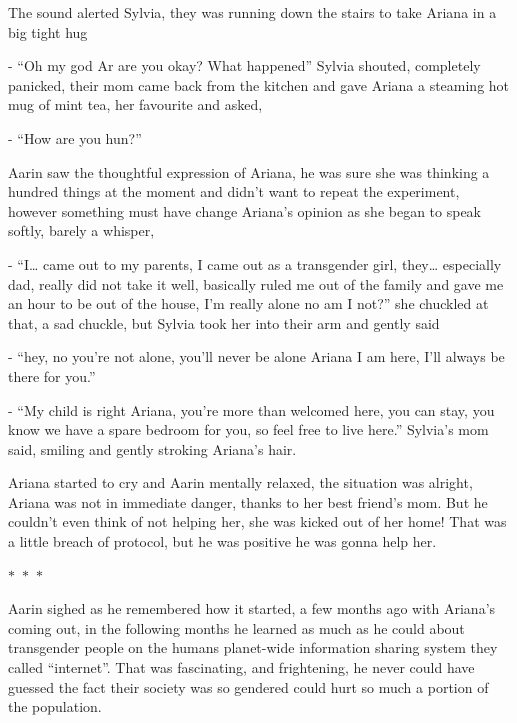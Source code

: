 \documentclass[colorlinks,12pt,a4paper]{book}
\newcommand\sep{\begin{center}
  \boldmath $\ast$~$\ast$~$\ast$
\end{center}}
\begin{document}
The sound alerted Sylvia, they was running down the stairs to take Ariana in a big tight hug\newline

- “Oh my god Ar are you okay? What happened” Sylvia shouted, completely panicked, 
their mom came back from the kitchen and gave Ariana a steaming hot mug of mint tea, her favourite and asked,\newline

- “How are you hun?”\par
\bigskip

Aarin saw the thoughtful expression of Ariana, he was sure she was thinking a hundred 
things at the moment and didn't want to repeat the experiment, however something must have change 
Ariana's opinion as she began to speak softly, barely a whisper, \par
\bigskip

- “I… came out to my parents, I came out as a transgender girl, they… especially dad, 
really did not take it well, basically ruled me out of the family and gave me an hour to be out 
of the house, I'm really alone no am I not?” she chuckled at that, a sad chuckle, 
but Sylvia took her into their arm and gently said\par
\bigskip
- “hey, no you're not alone, you'll never be alone Ariana I am here, I'll always be there for you.”\par
\bigskip
- “My child is right Ariana, you're more than welcomed here, you can stay,
 you know we have a spare bedroom for you, so feel free to live here.” Sylvia's mom said,
  smiling and gently stroking Ariana's hair.\par
  \bigskip

Ariana started to cry and Aarin mentally relaxed, the situation was alright, 
Ariana was not in immediate danger, thanks to her best friend's mom.
 But he couldn't even think of not helping her, she was kicked out of her home! That was a little breach of protocol,
 but he was positive he was gonna help her.

 \sep

Aarin sighed as he remembered how it started, a few months ago with Ariana's coming out, in the following months he 
learned as much as he could about transgender people on the humans planet-wide information sharing system 
they called “internet”. That was fascinating, and frightening, he never could have guessed the fact their 
society was so gendered could hurt so much a portion of the population.\par
\bigskip
\end{document}

